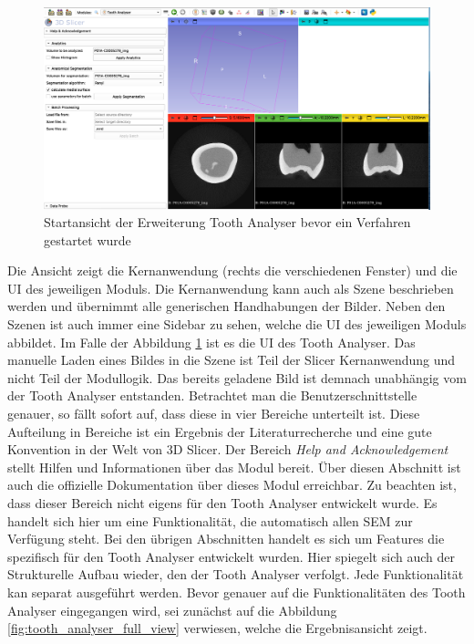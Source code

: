 \begin{figure}[h]
	\centering
	\includegraphics[scale=0.2, width=\textwidth]{img/toothAnalyserStarUp.png}
	\caption{Startansicht der Erweiterung Tooth Analyser bevor ein Verfahren
	gestartet wurde}
	\label{fig:tooth_analyser_start_up}
\end{figure}

Die Ansicht zeigt die Kernanwendung (rechts die verschiedenen Fenster) und die \ac{UI}
des jeweiligen Moduls. Die Kernanwendung kann auch als Szene beschrieben werden und
übernimmt alle generischen Handhabungen der Bilder. Neben den Szenen ist auch
immer eine Sidebar zu sehen, welche die \ac{UI} des jeweiligen Moduls abbildet. Im
Falle der Abbildung \ref{fig:tooth_analyser_start_up} ist es die \ac{UI} des
Tooth Analyser. Das manuelle Laden eines Bildes in die Szene ist Teil der Slicer
Kernanwendung und nicht Teil der Modullogik. Das bereits geladene Bild ist
demnach unabhängig vom der Tooth Analyser entstanden. Betrachtet man die Benutzerschnittstelle
genauer, so fällt sofort auf, dass diese in vier Bereiche unterteilt ist. Diese
Aufteilung in Bereiche ist ein Ergebnis der Literaturrecherche und eine gute
Konvention in der Welt von 3D Slicer. Der Bereich \textit{Help and
Acknowledgement} stellt Hilfen und Informationen über das Modul bereit. Über diesen
Abschnitt ist auch die offizielle Dokumentation über dieses Modul erreichbar. Zu
beachten ist, dass dieser Bereich nicht eigens für den Tooth Analyser entwickelt
wurde. Es handelt sich hier um eine Funktionalität, die automatisch allen \ac{SEM}
zur Verfügung steht. Bei den übrigen Abschnitten handelt es sich um Features die
spezifisch für den Tooth Analyser entwickelt wurden. Hier spiegelt sich auch der
Strukturelle Aufbau wieder, den der Tooth Analyser verfolgt. Jede Funktionalität
kan separat ausgeführt werden. Bevor genauer auf die Funktionalitäten des Tooth Analyser
eingegangen wird, sei zunächst auf die Abbildung
\ref{fig:tooth_analyser_full_view} verwiesen, welche die Ergebnisansicht zeigt.

